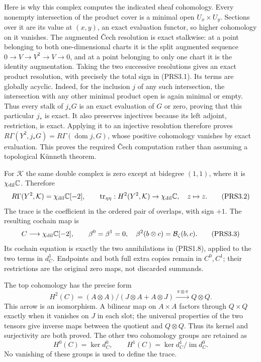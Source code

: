 Here is why this complex computes the indicated sheaf cohomology. Every
nonempty intersection of the product cover is a minimal open
\(U_x\times U_y\). Sections over it are its value at \((x,y)\), an exact
evaluation functor, so higher cohomology on it vanishes. The augmented
Čech resolution is exact stalkwise: at a point belonging to both
one-dimensional charts it is the split augmented sequence
\(0\to V\to V^2\to V\to0\), and at a point belonging to only one chart
it is the identity augmentation. Taking the two successive resolutions
gives an exact product resolution, with precisely the total sign in
(PRS3.1). Its terms are globally acyclic. Indeed, for the inclusion
\(j\) of any such intersection, the intersection with any other minimal
product open is again minimal or empty. Thus every stalk of \(j_*G\) is
an exact evaluation of \(G\) or zero, proving that this particular
\(j_*\) is exact. It also preserves injectives because its left adjoint,
restriction, is exact. Applying it to an injective resolution therefore
proves \(R\Gamma(Y^2,j_*G)=R\Gamma(\operatorname{dom}j,G)\), whose
positive cohomology vanishes by exact evaluation. This proves the
required Čech computation rather than assuming a topological Künneth
theorem.

For \(\mathcal K\) the same double complex is zero except at bidegree
\((1,1)\), where it is \(\chi_{\rm dil}\mathbb C\). Therefore \[
R\Gamma(Y^2,\mathcal K)=\chi_{\rm dil}\mathbb C[-2],\qquad
\operatorname{tr}_{\eta\eta}:H^2(Y^2,\mathcal K)\to\chi_{\rm dil}\mathbb C,\quad z\mapsto z.
\tag{PRS3.2}
\] The trace is the coefficient in the ordered pair of overlaps, with
sign \(+1\). The resulting cochain map is \[
C\longrightarrow\chi_{\rm dil}\mathbb C[-2],\qquad
\beta^0=\beta^1=0,\quad \beta^2(b\otimes c)=\mathcal B_\zeta(b,c).
\tag{PRS3.3}
\] Its cochain equation is exactly the two annihilations in (PRS1.8),
applied to the two terms in \(d_C^1\). Endpoints and both full extra
copies remain in \(C^0,C^1\); their restrictions are the original zero
maps, not discarded summands.

The top cohomology has the precise form \[
H^2(C)=(A\otimes A)/(J\otimes A+A\otimes J)\xrightarrow{\ \pi\otimes\pi\ }Q\otimes Q.
\tag{PRS3.4}
\] This arrow is an isomorphism. A bilinear map on \(A\times A\) factors
through \(Q\times Q\) exactly when it vanishes on \(J\) in each slot;
the universal properties of the two tensors give inverse maps between
the quotient and \(Q\otimes Q\). Thus its kernel and surjectivity are
both proved. The other two cohomology groups are retained as \[
H^0(C)=\ker d_C^0,\qquad H^1(C)=\ker d_C^1/\operatorname{im}d_C^0.
\tag{PRS3.5}
\] No vanishing of these groups is used to define the trace.

